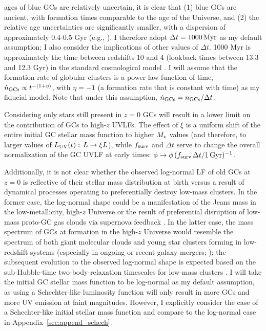 \documentclass[fleqn,usenatbib]{mnras}
\newcommand{\fsurv}{f_{\rm surv}}
\begin{document}
\begin{itemize}
  ages of blue GCs are relatively uncertain, it is clear that (1) blue GCs are
  ancient, with formation times comparable to the age of the Universe, and (2)
  the relative age uncertainties are significantly smaller, with a dispersion of
  approximately 0.4-0.5 Gyr (e.g., \citealt{marin-franch2009,
    vandenberg2013}). I therefore adopt $\Delta t=1000\,{\rm Myr}$ as my default
  assumption; I also consider the implications of other values of $\Delta
  t$. 1000 Myr is approximately the time between redshifts 10 and 4 (lookback
  times between 13.3 and 12.3 Gyr) in the standard cosmological model
  \citep{planck2015}. I will assume that the formation rate of globular clusters
  is a power law function of time, $\dot{n}_{\rm GCs} \propto t^{-(1+\eta)}$,
  with $\eta=-1$ (a formation rate that is constant with time) as my fiducial
  model. Note that under this assumption,
  $\dot{n}_{\rm GCs}={n}_{\rm GCs}/\Delta t$.
\end{itemize}

Considering only stars still present in $z=0$ GCs will result in a lower limit on
the contribution of GCs to high-$z$ UVLFs. The effect of $\xi$ is a uniform
shift of the entire initial GC stellar mass function to higher $M_{\star}$ values
(and therefore, to larger values of $L_{\rm UV}(t):\,L \rightarrow \xi L$),
while $\fsurv$ and $\Delta t$ serve to change the overall normalization of the
GC UVLF at early times:
$\phi \rightarrow \phi \, (\fsurv\,\Delta t / 1 \,{\rm Gyr})^{-1}$.

Additionally, it is not clear whether the observed log-normal LF of old GCs at
$z=0$ is reflective of their stellar mass distribution at birth versus a result
of dynamical processes operating to preferentially destroy low-mass clusters. In
the former case, the log-normal shape could be a manifestation of the Jeans mass
in the low-metallicity, high-$z$ Universe \citep{peebles1968, fall1985} or the
result of preferential disruption of low-mass proto-GC gas clouds via supernova
feedback \citep{parmentier2007, baumgardt2008}. In the latter case, the mass
spectrum of GCs at formation in the high-$z$ Universe would resemble the
spectrum of both giant molecular clouds \citep{solomon1987, rosolowsky2005,
  krumholz2015} and young star clusters forming in low-redshift systems
(especially in ongoing or recent galaxy mergers; \citealt{whitmore1995,
  larsen2002, portegies-zwart2010}); the subsequent evolution to the observed
log-normal shape is expected based on the sub-Hubble-time two-body-relaxation
timescales for low-mass clusters \citep{fall2001, prieto2008}. I will take the
initial GC stellar mass function to be log-normal as my default assumption, as
using a Schechter-like luminosity function will only result in more GCs and more
UV emission at faint magnitudes. However, I explicitly consider the case of a
Schechter-like initial stellar mass function and compare to the log-normal case
in Appendix~\ref{sec:append_schech}.
\end{document}
